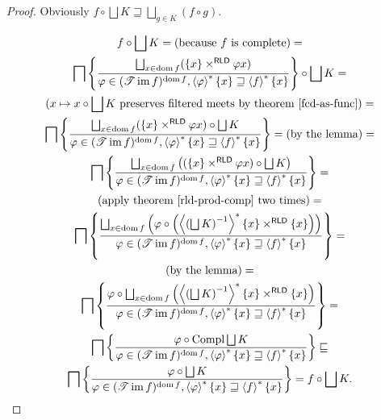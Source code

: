 \begin{proof}
Obviously $f\circ\bigsqcup K \sqsupseteq \bigsqcup_{g \in K}(f\circ g)$.

\begin{multline*}
f\circ\bigsqcup K = \text{(because $f$ is complete)} =\\
\bigsqcap\setcond{\bigsqcup_{x\in\dom f}(\{x\}\times^{\mathsf{RLD}}\varphi x)}{\varphi\in(\mathscr{T}\im f)^{\dom f}, \rsupfun{\varphi}\{x\}\sqsupseteq\rsupfun{f}\{x\}}\circ\bigsqcup K =\\
\text{($x\mapsto x\circ\bigsqcup K$ preserves filtered meets by theorem \ref{fcd-as-func})} = \\
\bigsqcap\setcond{\bigsqcup_{x\in\dom f}(\{x\}\times^{\mathsf{RLD}}\varphi x)\circ\bigsqcup K}{\varphi\in(\mathscr{T}\im f)^{\dom f}, \rsupfun{\varphi}\{x\}\sqsupseteq\rsupfun{f}\{x\}} =
\text{(by the lemma)} = \\
\bigsqcap\setcond{\bigsqcup_{x\in\dom f}\left((\{x\}\times^{\mathsf{RLD}}\varphi x)\circ\bigsqcup K\right)}{\varphi\in(\mathscr{T}\im f)^{\dom f}, \rsupfun{\varphi}\{x\}\sqsupseteq\rsupfun{f}\{x\}} =\\
\text{(apply theorem~\ref{rld-prod-comp} two times)} =\\
\bigsqcap\setcond{\bigsqcup_{x\in\dom f}\left(\varphi\circ\left(\rsupfun{\left(\bigsqcup K\right)^{-1}}\{x\}\times^{\mathsf{RLD}}\{x\}\right)\right)}{\varphi\in(\mathscr{T}\im f)^{\dom f}, \rsupfun{\varphi}\{x\}\sqsupseteq\rsupfun{f}\{x\}} =\\
\text{(by the lemma)} = \\
\bigsqcap\setcond{\varphi\circ\bigsqcup_{x\in\dom f}\left(\rsupfun{\left(\bigsqcup K\right)^{-1}}\{x\}\times^{\mathsf{RLD}}\{x\}\right)}{\varphi\in(\mathscr{T}\im f)^{\dom f}, \rsupfun{\varphi}\{x\}\sqsupseteq\rsupfun{f}\{x\}} =\\
\bigsqcap\setcond{\varphi\circ\Compl\bigsqcup K}{\varphi\in(\mathscr{T}\im f)^{\dom f}, \rsupfun{\varphi}\{x\}\sqsupseteq\rsupfun{f}\{x\}} \sqsubseteq\\
\bigsqcap\setcond{\varphi\circ\bigsqcup K}{\varphi\in(\mathscr{T}\im f)^{\dom f}, \rsupfun{\varphi}\{x\}\sqsupseteq\rsupfun{f}\{x\}} =
f\circ\bigsqcup K.
\end{multline*}
\end{proof}

